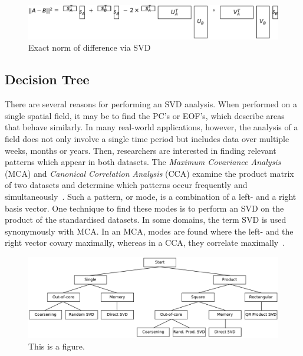 \documentclass[ijgi,article,submit,moreauthors,pdftex,10pt,a4paper]{Definitions/mdpi}
\begin{document}
\begin{figure}[H]
\centering
\includegraphics[width=130mm]{Results/normDifferenceFromUSVs.pdf}
\caption[Exact norm of difference]{Exact norm of difference via SVD}
\label{fig:normDifferenceFromUSVs}
\end{figure}

\subsection{Decision Tree}
\label{sec:Introduction/Decision Tree}

There are several reasons for performing an SVD analysis. When performed on a single spatial field, it may be to find the PC's or EOF's, which describe areas that behave similarly. In many real-world applications, however, the analysis of a field does not only involve a single time period but includes data over multiple weeks, months or years. Then, researchers are interested in finding relevant patterns which appear in both datasets. The \textit{Maximum Covariance Analysis} (MCA) and \textit{Canonical Correlation Analysis} (CCA) examine the product matrix of two datasets and determine which patterns occur frequently and simultaneously~\cite{Eshel2011, Storch1999}. Such a pattern, or mode, is a combination of a left- and a right basis vector. One technique to find these modes is to perform an SVD on the product of the standardised datasets. In some domains, the term SVD is used synonymously with MCA. In an MCA, modes are found where the left- and the right vector covary maximally, whereas in a CCA, they correlate maximally~\cite{Bretherton1992}.

\begin{figure}[H]
\centering
\includegraphics[width=\textwidth]{Results/FlowDiagram.pdf}
\caption{This is a figure.}
\label{fig:FlowDiagram}
\end{figure}
\end{document}
